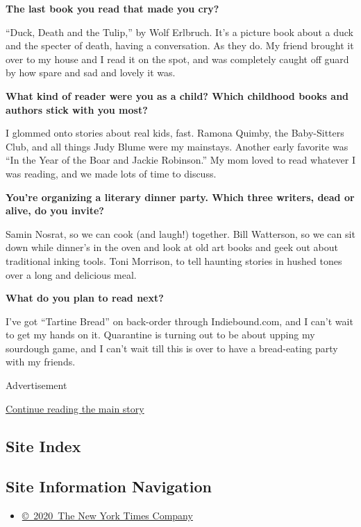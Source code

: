\textbf{The last book you read that made you cry?}

``Duck, Death and the Tulip,'' by Wolf Erlbruch. It's a picture book
about a duck and the specter of death, having a conversation. As they
do. My friend brought it over to my house and I read it on the spot, and
was completely caught off guard by how spare and sad and lovely it was.

\textbf{What kind of reader were you as a child? Which childhood books
and authors stick with you most?}

I glommed onto stories about real kids, fast. Ramona Quimby, the
Baby-Sitters Club, and all things Judy Blume were my mainstays. Another
early favorite was ``In the Year of the Boar and Jackie Robinson.'' My
mom loved to read whatever I was reading, and we made lots of time to
discuss.

\textbf{You're organizing a literary dinner party. Which three writers,
dead or alive, do you invite?}

Samin Nosrat, so we can cook (and laugh!) together. Bill Watterson, so
we can sit down while dinner's in the oven and look at old art books and
geek out about traditional inking tools. Toni Morrison, to tell haunting
stories in hushed tones over a long and delicious meal.

\textbf{What do you plan to read next?}

I've got ``Tartine Bread'' on back-order through Indiebound.com, and I
can't wait to get my hands on it. Quarantine is turning out to be about
upping my sourdough game, and I can't wait till this is over to have a
bread-eating party with my friends.

Advertisement

\protect\hyperlink{after-bottom}{Continue reading the main story}

\hypertarget{site-index}{%
\subsection{Site Index}\label{site-index}}

\hypertarget{site-information-navigation}{%
\subsection{Site Information
Navigation}\label{site-information-navigation}}

\begin{itemize}
\tightlist
\item
  \href{https://help.nytimes3xbfgragh.onion/hc/en-us/articles/115014792127-Copyright-notice}{©~2020~The
  New York Times Company}
\end{itemize}

